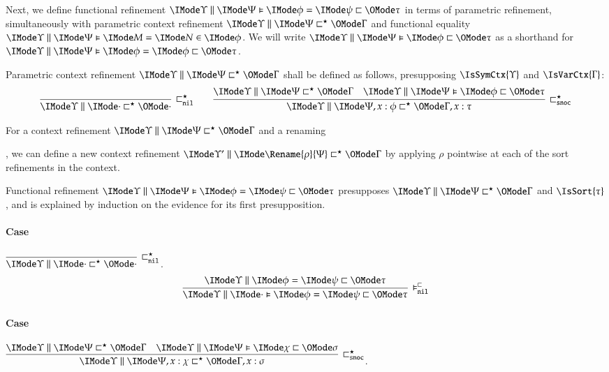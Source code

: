 \documentclass[11pt]{article}
\theoremstyle{definition}
\theoremstyle{notation}
\theoremstyle{remark}
\numberwithin{equation}{section}
\begin{document}
Next, we define functional refinement
$\FEqRefines{\Upsilon}{\Psi}{\phi}{\psi}{\tau}$ in terms of parametric refinement,
simultaneously with parametric context refinement
$\RefinesCtx{\Upsilon}{\Psi}{\Gamma}$ and functional equality
$\FRMemEq{\Upsilon}{\Psi}{M}{N}{\phi}$. We will write
$\FRefines{\Upsilon}{\Psi}{\phi}{\tau}$ as a shorthand for
$\FEqRefines{\Upsilon}{\Psi}{\phi}{\phi}{\tau}$.

\newcommand\DefRefinesCtxNil[1]{
  \infer[\RefinesCtxNil]{
    \RefinesCtx{#1}{\cdot}{\cdot}
  }{
  }
}
\newcommand\DefRefinesCtxSnoc[6]{
  \infer[\RefinesCtxSnoc]{
    \RefinesCtx{#1}{#2,#3:#4}{#5,#3:#6}
  }{
    \RefinesCtx{#1}{#2}{#5} &
    \FRefines{#1}{#2}{#4}{#6}
  }
}

Parametric context refinement $\RefinesCtx{\Upsilon}{\Psi}{\Gamma}$ shall be
defined as follows, presupposing $\IsSymCtx{\Upsilon}$ and
$\IsVarCtx{\Gamma}$:
\begin{gather*}
  \DefRefinesCtxNil{\Upsilon}\qquad
  \DefRefinesCtxSnoc{\Upsilon}{\Psi}{x}{\phi}{\Gamma}{\tau}
\end{gather*}

For a context refinement $\RefinesCtx{\Upsilon}{\Psi}{\Gamma}$ and a renaming
, we can define a new context refinement
$\RefinesCtx{\Upsilon'}{\Rename{\rho}{\Psi}}{\Gamma}$ by applying $\rho$ pointwise at
each of the sort refinements in the context.

Functional refinement $\FEqRefines{\Upsilon}{\Psi}{\phi}{\psi}{\tau}$ presupposes
$\RefinesCtx{\Upsilon}{\Psi}{\Gamma}$ and $\IsSort{\tau}$, and is explained by
induction on the evidence for its first presupposition.

\paragraph{Case} $\DefRefinesCtxNil{\Upsilon}$.
\[
  \infer[\PFunRefNil]{
    \FEqRefines{\Upsilon}{\cdot}{\phi}{\psi}{\tau}
  }{
    \EqRefines{\Upsilon}{\phi}{\psi}{\tau}
  }
\]

\paragraph{Case} $\DefRefinesCtxSnoc{\Upsilon}{\Psi}{x}{\chi}{\Gamma}{\sigma}$.
\end{document}
